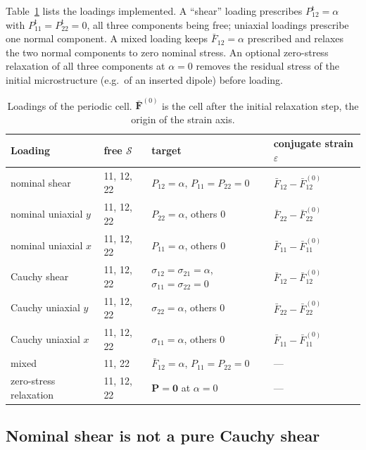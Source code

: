 \documentclass[11pt,a4paper]{article}
\newcommand{\Fb}{\bar{\mathbf F}}
\newcommand{\Pk}{\mathbf P}
\begin{document}
Table~\ref{tab:presets} lists the loadings implemented. A ``shear'' loading prescribes
\(P^{\mathrm t}_{12}=\alpha\) with \(P^{\mathrm t}_{11}=P^{\mathrm t}_{22}=0\), all three components
being free; uniaxial loadings prescribe one normal component. A mixed loading keeps
\(\bar F_{12}=\alpha\) prescribed and relaxes the two normal components to zero nominal stress.
An optional zero-stress relaxation of all three components at \(\alpha=0\) removes the residual
stress of the initial microstructure (e.g.\ of an inserted dipole) before loading.

\begin{table}[t]
\centering
\begin{tabular}{@{}llll@{}}
\toprule
Loading & free \(\mathcal S\) & target & conjugate strain \(\varepsilon\)\\
\midrule
nominal shear & 11, 12, 22 & \(P_{12}=\alpha\), \(P_{11}=P_{22}=0\) & \(\bar F_{12}-\bar F^{(0)}_{12}\)\\
nominal uniaxial \(y\) & 11, 12, 22 & \(P_{22}=\alpha\), others 0 & \(\bar F_{22}-\bar F^{(0)}_{22}\)\\
nominal uniaxial \(x\) & 11, 12, 22 & \(P_{11}=\alpha\), others 0 & \(\bar F_{11}-\bar F^{(0)}_{11}\)\\
Cauchy shear & 11, 12, 22 & \(\sigma_{12}=\sigma_{21}=\alpha\), \(\sigma_{11}=\sigma_{22}=0\) & \(\bar F_{12}-\bar F^{(0)}_{12}\)\\
Cauchy uniaxial \(y\) & 11, 12, 22 & \(\sigma_{22}=\alpha\), others 0 & \(\bar F_{22}-\bar F^{(0)}_{22}\)\\
Cauchy uniaxial \(x\) & 11, 12, 22 & \(\sigma_{11}=\alpha\), others 0 & \(\bar F_{11}-\bar F^{(0)}_{11}\)\\
mixed & 11, 22 & \(\bar F_{12}=\alpha\), \(P_{11}=P_{22}=0\) & ---\\
zero-stress relaxation & 11, 12, 22 & \(\Pk=\mathbf 0\) at \(\alpha=0\) & ---\\
\bottomrule
\end{tabular}
\caption{Loadings of the periodic cell. \(\Fb^{(0)}\) is the cell after the initial relaxation
step, the origin of the strain axis.}
\label{tab:presets}
\end{table}

\subsection{Nominal shear is not a pure Cauchy shear}
\end{document}
